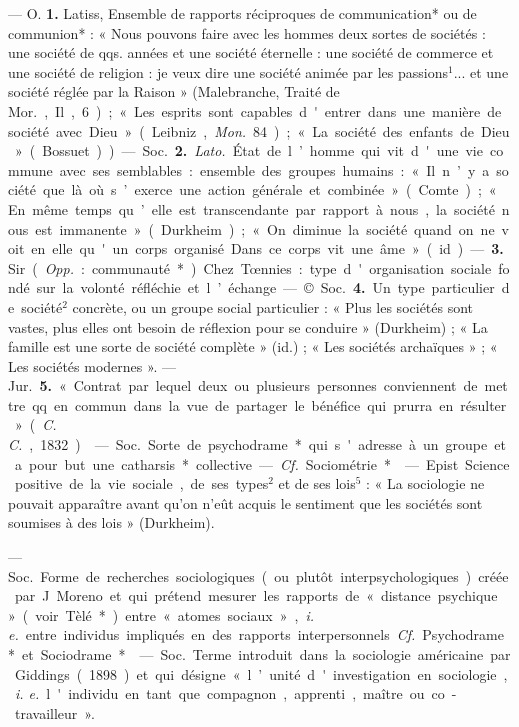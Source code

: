 \begin{itemize}[leftmargin=1cm, label=, itemsep=1pt]
 — O. {\bf 1.} Latiss, Ensemble de
rapports réciproques de communication* ou de communion* :
« Nous pouvons faire avec les
hommes deux sortes de sociétés :
une société de qqs. années et une
société éternelle : une société de
commerce et une société de religion : je veux dire une société animée par les passions$^1$... et une société réglée par la Raison » (Malebranche, Traité de \si{Mor.}, Il, 6) ;
« Les esprits sont capables d'entrer
dans une manière de société avec
Dieu » (Leibniz, {\it Mon.} 84) ; « La
société des enfants de Dieu » (Bossuet)). — \si{Soc.} {\bf 2.} {\it Lato.} État de
l’homme qui vit d'une vie commune avec ses semblables: ensemble
des groupes humains : « Il n’y a
société que là où s’exerce une action
générale et combinée » (Comte) ;
« En même temps qu’elle est transcendante par rapport à nous, la
société nous est immanente » (Durkheim) ; « On diminue la société
quand on ne voit en elle qu'un
corps organisé... Dans ce corps vit
une âme » (id.). — {\bf 3.} Sir. ({\it Opp.} :
communauté*). Chez Tœnnies : type
d'organisation sociale fondé sur la
volonté réfléchie et l’échange.

— ©. \si{Soc.} {\bf 4.} Un type particulier
de société$^2$ concrète, ou un groupe
social particulier : « Plus les sociétés
sont vastes, plus elles ont besoin de
réflexion pour se conduire » (Durkheim) ; « La famille est une sorte
de société complète » (id.) ; « Les
sociétés archaïques » ; « Les sociétés
modernes ». — \si{Jur.} {\bf 5.} « Contrat par
lequel deux ou plusieurs personnes
conviennent de mettre qq. en
commun dans la vue de partager le
bénéfice qui prurra en résulter »
({\it C. C.}, 1832).

 — \si{Soc.} Sorte de psychodrame* qui s'adresse à un groupe
et a pour but une catharsis* collective. — {\it Cf.} Sociométrie*.

 — Epist. Science positive
de la vie sociale, de ses types$^2$ et
de ses lois$^5$ : « La sociologie ne
pouvait apparaître avant qu’on
n’eût acquis le sentiment que les
sociétés sont soumises à des lois »
(Durkheim).

 — \si{Soc.} Forme de recherches sociologiques (ou plutôt interpsychologiques) créée par J. Moreno
et qui prétend mesurer les rapports
de « distance psychique » (voir
Tèlé*) entre « atomes sociaux », {\it i. e.}
entre individus impliqués en des
rapports interpersonnels. {\it Cf.} Psychodrame* et Sociodrame*.

 — \si{Soc.} Terme introduit dans
la sociologie américaine par Giddings (1898) et qui désigne « l’unité
d'investigation en sociologie, {\it i. e.}
l'individu en tant que compagnon,
apprenti, maître ou co-travailleur ».


\end{itemize}
